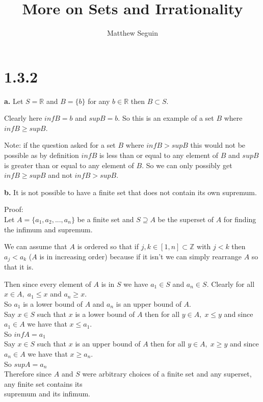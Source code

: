 \documentclass{article}
\title{More on Sets and Irrationality}
\author{Matthew Seguin}
\date{}
\begin{document}
\maketitle

\section*{1.3.2}

{\Large \textbf{a.}} Let $S = \mathbb{R}$ and $B = \{b\}$ for any $b\in\mathbb{R}$ then $B\subset S$.
\begin{center}
    \doublespacing
    Clearly here $inf B = b$ and $sup B = b$. So this is an example of a set $B$ where $inf B \geq sup B$.
    \begin{singlespace}
        Note: if the question asked for a set $B$ where $inf B > sup B$ this would not be possible as by definition $inf B$ is less than or equal to any element of $B$ and $sup B$ is greater than or equal to any element of $B$. So we can only possibly get $inf B \geq sup B$ and not $inf B > sup B$.
    \end{singlespace}
\end{center}

{\Large \textbf{b.}} It is not possible to have a finite set that does not contain its own supremum.
\begin{center}
    \doublespacing
    Proof:
    \\Let $A = \{a_1, a_2, ..., a_n\}$ be a finite set and $S\supseteq A$ be the superset of $A$ for finding the infimum and supremum.
    \begin{singlespace}
        We can assume that $A$ is ordered so that if $j, k\in [1, n]\subset\mathbb{Z}$ with $j < k$ then $a_j < a_k$ ($A$ is in increasing order) because if it isn't we can simply rearrange $A$ so that it is.
    \end{singlespace}
    Then since every element of $A$ is in $S$ we have $a_1\in S$ and $a_n\in S$. Clearly for all $x\in A, \;a_1\leq x$ and $a_n\geq x$.
    \\So $a_1$ is a lower bound of $A$ and $a_n$ is an upper bound of $A$.
    \\Say $x\in S$ such that $x$ is a lower bound of $A$ then for all $y\in A, \;x\leq y$ and since $a_1\in A$ we have that $x\leq a_1$.
    \\So $inf A = a_1$
    \\Say $x\in S$ such that $x$ is an upper bound of $A$ then for all $y\in A, \;x\geq y$ and since $a_n\in A$ we have that $x\geq a_n$.
    \\So $sup A = a_n$
    \\Therefore since $A$ and $S$ were arbitrary choices of a finite set and any superset, any finite set contains its
    \\supremum and its infimum. \qedsymbol
\end{center}
\end{document}
